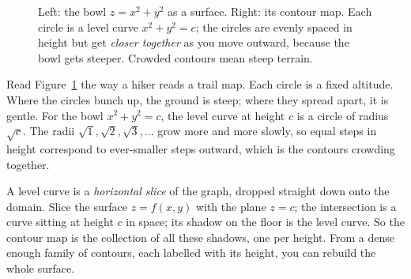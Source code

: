 \begin{figure}[H]
\centering
{}
\hspace{0.3cm}
\caption{Left: the bowl $z=x^2+y^2$ as a surface. Right: its contour map. Each circle is a
level curve $x^2+y^2=c$; the circles are evenly spaced in height but get \emph{closer together}
as you move outward, because the bowl gets steeper. Crowded contours mean steep terrain.}
\label{ch32:fig-paraboloid}
\end{figure}

Read Figure~\ref{ch32:fig-paraboloid} the way a hiker reads a trail map. Each circle is a
fixed altitude. Where the circles bunch up, the ground is steep; where they spread apart, it
is gentle. For the bowl $x^2+y^2=c$, the level curve at height $c$ is a circle of radius
$\sqrt{c}$. The radii $\sqrt{1},\sqrt{2},\sqrt{3},\dots$ grow more and more slowly, so equal
steps in height correspond to ever-smaller steps outward, which is the contours
crowding together.

\begin{happeningbox}
A level curve is a \emph{horizontal slice} of the graph, dropped straight down onto the
domain. Slice the surface $z=f(x,y)$ with the plane $z=c$; the intersection is a curve sitting
at height $c$ in space; its shadow on the floor is the level curve. So the contour map is the
collection of all these shadows, one per height. From a dense enough family of contours,
each labelled with its height, you can rebuild the whole surface.
\end{happeningbox}

